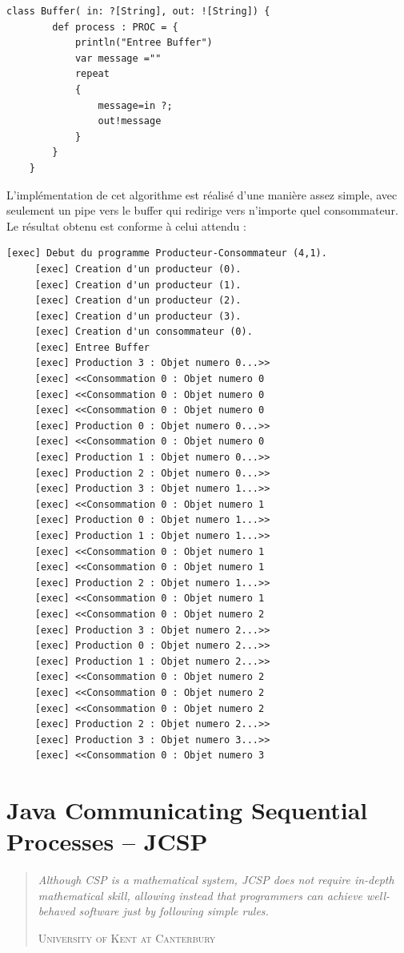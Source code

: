 \documentclass[a4paper,11pt,french]{report}
\begin{document}
\begin{lstlisting}[frame=trBL,title={Producteurs-Consommateurs : Buffer}, firstnumber=last]    
    class Buffer( in: ?[String], out: ![String]) {
        def process : PROC = {
            println("Entree Buffer")
            var message =""
            repeat 
            {
                message=in ?; 
                out!message
            }
        }
    }
\end{lstlisting} 

L'implémentation de cet algorithme est réalisé d'une manière assez simple, avec seulement un pipe vers le buffer qui redirige vers n'importe quel consommateur.\\
Le résultat obtenu est conforme à celui attendu :

\begin{lstlisting}[frame=trBL,title={Producteurs-Consommateurs : Résultat de l'éxécution}, firstnumber=last]   
     [exec] Debut du programme Producteur-Consommateur (4,1).
     [exec] Creation d'un producteur (0).
     [exec] Creation d'un producteur (1).
     [exec] Creation d'un producteur (2).
     [exec] Creation d'un producteur (3).
     [exec] Creation d'un consommateur (0).
     [exec] Entree Buffer
     [exec] Production 3 : Objet numero 0...>>
     [exec] <<Consommation 0 : Objet numero 0
     [exec] <<Consommation 0 : Objet numero 0
     [exec] <<Consommation 0 : Objet numero 0
     [exec] Production 0 : Objet numero 0...>>
     [exec] <<Consommation 0 : Objet numero 0
     [exec] Production 1 : Objet numero 0...>>
     [exec] Production 2 : Objet numero 0...>>
     [exec] Production 3 : Objet numero 1...>>
     [exec] <<Consommation 0 : Objet numero 1
     [exec] Production 0 : Objet numero 1...>>
     [exec] Production 1 : Objet numero 1...>>
     [exec] <<Consommation 0 : Objet numero 1
     [exec] <<Consommation 0 : Objet numero 1
     [exec] Production 2 : Objet numero 1...>>
     [exec] <<Consommation 0 : Objet numero 1
     [exec] <<Consommation 0 : Objet numero 2
     [exec] Production 3 : Objet numero 2...>>
     [exec] Production 0 : Objet numero 2...>>
     [exec] Production 1 : Objet numero 2...>>
     [exec] <<Consommation 0 : Objet numero 2
     [exec] <<Consommation 0 : Objet numero 2
     [exec] <<Consommation 0 : Objet numero 2
     [exec] Production 2 : Objet numero 2...>>
     [exec] Production 3 : Objet numero 3...>>
     [exec] <<Consommation 0 : Objet numero 3
\end{lstlisting} 

\chapter[JCSP]{Java Communicating Sequential Processes -- JCSP}
\begin{quotation}
\textit{\og Although CSP is a mathematical system, JCSP does not require in-depth mathematical skill, allowing instead that programmers can achieve well-behaved software just by following simple rules.\fg}
\begin{flushright}
\textsc{University of Kent at Canterbury}
\end{flushright}
\end{quotation}
\end{document}
